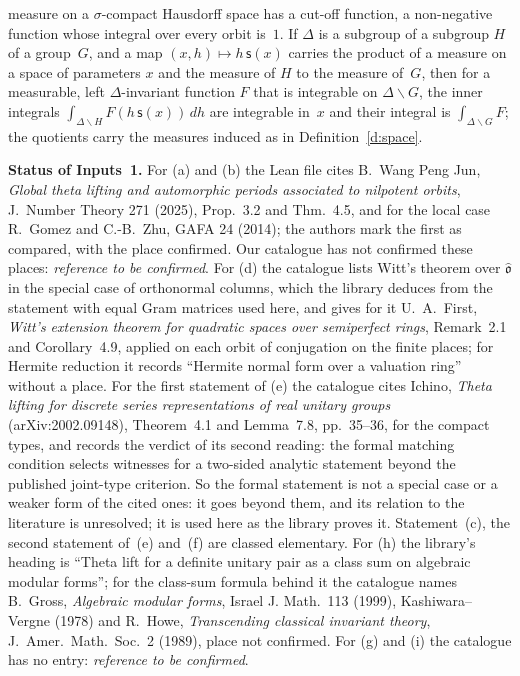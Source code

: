 \documentclass[11pt,a4paper]{article}
\newcommand{\m}[1]{\mbox{$#1$}}        %
\newcommand{\subhead}[1]{\par\addvspace{9pt plus 2pt}\Needspace{4\baselineskip}\noindent\textbf{#1}\enspace\ignorespaces}
\theoremstyle{plainx}
\theoremstyle{uprightx}
\newcommand{\Oh}{\hat{\mathfrak{o}}}
\begin{document}
{\begin{enumerate}[label=(\alph*),start=5]
  measure on a $\sigma$-compact Hausdorff space has a cut-off function, a non-negative function whose integral
  over every orbit is~$1$. If $\Delta$ is a subgroup of a subgroup $H$ of a group~$G$, and a map
  \m{(x,h)\mapsto h\,\mathsf{s}(x)} carries the product of a measure on a space of parameters $x$ and the measure
  of $H$ to the measure of~$G$, then for a measurable, left $\Delta$-invariant function $F$ that is integrable on
  \m{\Delta\backslash G}, the inner integrals \m{\int_{\Delta\backslash H}F(h\,\mathsf{s}(x))\,dh} are integrable
  in~$x$ and their integral is \m{\int_{\Delta\backslash G}F}; the quotients carry the measures induced as in
  Definition~\ref{d:space}.
\end{enumerate}}

\subhead{Status of Inputs~1.} For (a) and (b) the Lean file cites B.~Wang Peng Jun, \emph{Global theta lifting and automorphic
periods associated to nilpotent orbits}, J.~Number Theory 271 (2025), Prop.~3.2 and Thm.~4.5, and for the local
case R.~Gomez and C.-B.~Zhu, GAFA 24 (2014); the authors mark the first as compared, with the place confirmed. Our
catalogue has not confirmed these places: \emph{reference to be confirmed}. For (d) the catalogue lists Witt's
theorem over $\Oh$ in the special case of orthonormal columns, which the library deduces from the statement with
equal Gram matrices used here, and gives for it U.~A.~First, \emph{Witt's extension theorem for quadratic spaces
over semiperfect rings}, Remark~2.1 and Corollary~4.9, applied on each orbit of conjugation on the finite places;
for Hermite reduction it records ``Hermite normal form over a valuation ring'' without a place. For the first
statement of (e) the catalogue cites Ichino, \emph{Theta lifting for discrete series representations of real
unitary groups} (arXiv:2002.09148), Theorem~4.1 and Lemma~7.8, pp.~35--36, for the compact types, and records the
verdict of its second reading: the formal matching condition selects witnesses for a two-sided analytic
statement beyond the published joint-type criterion. So the formal statement is not a special case or a weaker
form of the cited ones: it goes beyond them, and its relation to the literature is unresolved; it is used here
as the library proves it. Statement~(c), the second statement of~(e) and~(f) are classed elementary. For (h) the library's
heading is ``Theta lift for a definite unitary pair as a class sum on algebraic modular forms''; for the
class-sum formula behind it the catalogue names B.~Gross, \emph{Algebraic modular forms}, Israel J. Math.\ 113
(1999), Kashiwara--Vergne (1978) and R.~Howe, \emph{Transcending classical invariant theory}, J.~Amer.\ Math.\
Soc.\ 2 (1989), place not confirmed. For (g) and (i) the catalogue has no entry: \emph{reference to be
confirmed}.
\end{document}
